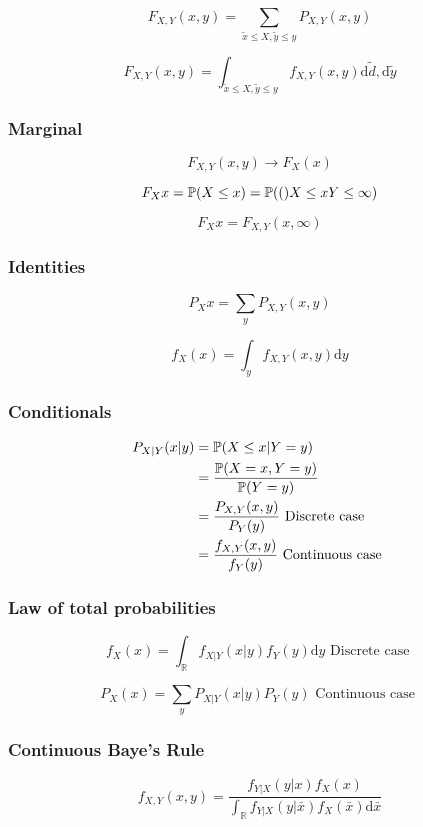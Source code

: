 $$
F_{X,Y}(x,y)=\sum_{\tilde{x}\leq X, \tilde{y}\leq y} P_{X,Y}(x,y)
$$

$$
F_{X,Y}(x,y)=\int_{\tilde{x}\leq X, \tilde{y}\leq y} f_{X,Y}(x,y) \text{d}\tilde{d},\text{d}\tilde{y}
$$

\subsubsection{Marginal}

$$
F_{X,Y}(x,y)\rightarrow F_X(x)
$$

$$
F_X{x}=\mathbb{P}(X\leq x)=\mathbb{P}(()X\leq x Y\leq \infty)
$$

$$
F_X{x}=F_{X,Y}(x,\infty)
$$

\subsubsection{Identities}

$$
P_X{x}=\sum_y P_{X,Y}(x,y)
$$

$$
f_X(x)=\int_y f_{X,Y}(x,y)\text{d}y
$$


\subsubsection{Conditionals}

\begin{align*}
P_{X|Y}(x|y)&=\mathbb{P}(X\leq x|Y=y)
\\&=\frac{\mathbb{P}(X=x,Y=y)}{\mathbb{P}(Y=y)}
\\&=\frac{P_{X,Y}(x,y)}{P_Y(y)}\text{ Discrete case }
\\&=\frac{f_{X,Y}(x,y)}{f_Y(y)}\text{ Continuous case }
\end{align*}

\subsubsection{Law of total probabilities}

$$
f_X(x)=\int_\mathbb{R} f_{X|Y}(x|y) f_Y(y)\text{d}y
\text{ Discrete case }
$$

$$
P_X(x)=\sum_y P_{X|Y}(x|y) P_Y(y)
\text{ Continuous case }
$$

\subsubsection{Continuous Baye's Rule}

$$
f_{X,Y}(x,y)=\frac{f_{Y|X}(y|x)f_X(x)}{\int_\mathbb{R}f_{Y|X}(y|\bar{x})f_X(\bar{x})\text{d}\bar{x}}
$$

